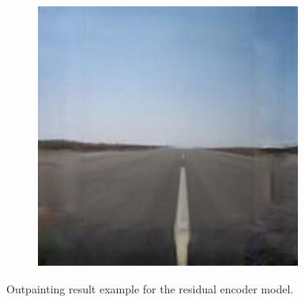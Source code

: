 \documentclass{article}
\begin{document}
\begin{figure}
	\captionsetup[subfigure]{labelformat=empty}
    \centering
    \begin{subfigure}[b]{0.25\textwidth}
        \includegraphics[width=\textwidth]{figs/fig4/fig4}
    \end{subfigure}
  	\caption{Outpainting result example for the residual encoder model.}
  	\label{fig:fig4}
\end{figure}
\end{document}
